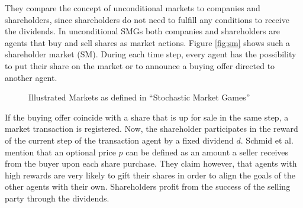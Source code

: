 They compare the concept of unconditional markets to companies and shareholders, since shareholders do not need to fulfill any conditions to receive the dividends. In unconditional SMGs both companies and shareholders are agents that buy and sell shares as market actions. Figure \ref{fig:sm} shows such a shareholder market (SM). During each time step, every agent has the possibility to put their share on the market or to announce a buying offer directed to another agent.

\begin{figure}[hpbt]
    \centering
    \hspace{0.01\textwidth}
    \caption[Illustrated Markets]{Illustrated Markets as defined in ``Stochastic Market Games'' \cite{scbe21}}
    \label{fig:multipic} %
\end{figure}

If the buying offer coincide with a share that is up for sale in the same step, a market transaction is registered. Now, the shareholder participates in the reward of the current step of the transaction agent by a fixed dividend $d$. Schmid et al. mention that an optional price $p$ can be defined as an amount a seller receives from the buyer upon each share purchase. They claim however, that agents with high rewards are very likely to gift their shares in order to align the goals of the other agents with their own. Shareholders profit from the success of the selling party through the dividends.

